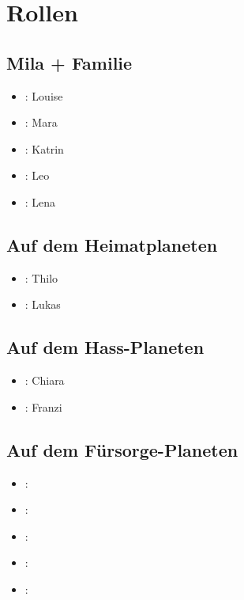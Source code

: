 \pagebreak

\section{Rollen}
\begin{multicols}{2}
\subsection{Mila + Familie}
\begin{itemize}
\item \milamh: Louise
\item \miladh: Mara
\item \mutterh: Katrin
\item \leonh: Leo
\item \lenah: Lena
\end{itemize}

\subsection{Auf dem Heimatplaneten}
\begin{itemize}
\item \alberth: Thilo
\item \theoh: Lukas
\end{itemize}

\subsection{Auf dem Hass-Planeten}
\begin{itemize}
\item \wilmah: Chiara
\item \wilhelmina: Franzi
\end{itemize}

\subsection{Auf dem Fürsorge-Planeten}
\begin{itemize}
\item \charlotteh:
\item \sophiah:
\item \emmah:
\item \aaronh:
\item \cleonh:
\end{itemize}
\end{multicols}

%


